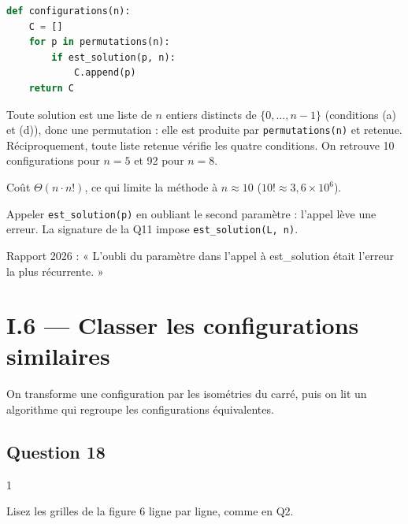 \documentclass[11pt,a4paper]{article}
\begin{document}
\begin{lstlisting}[language=Python]
def configurations(n):
    C = []
    for p in permutations(n):
        if est_solution(p, n):
            C.append(p)
    return C
\end{lstlisting}

Toute solution est une liste de \(n\) entiers distincts de \(\{0, \dots, n-1\}\) (conditions (a) et (d)), donc une permutation : elle est produite par \texttt{permutations(n)} et retenue. Réciproquement, toute liste retenue vérifie les quatre conditions. On retrouve 10 configurations pour \(n = 5\) et 92 pour \(n = 8\).

Coût \(\Theta(n \cdot n!)\), ce qui limite la méthode à \(n \approx 10\) (\(10! \approx 3{,}6 \times 10^6\)).

\begin{piege}

Appeler \texttt{est\_solution(p)} en oubliant le second paramètre : l'appel lève une erreur. La signature de la Q11 impose \texttt{est\_solution(\allowbreak{}L,\allowbreak{}\ n)\allowbreak{}}.

\end{piege}

\begin{jury}

Rapport 2026 : « L'oubli du paramètre dans l'appel à est\_solution était l'erreur la plus récurrente. »

\end{jury}

\hypertarget{i.6-classer-les-configurations-similaires}{%
\section{I.6 --- Classer les configurations similaires}\label{i.6-classer-les-configurations-similaires}}

On transforme une configuration par les isométries du carré, puis on lit un algorithme qui regroupe les configurations équivalentes.

\hypertarget{question-18}{%
\subsection{Question 18}\label{question-18}}

\begin{indication}{1}

Lisez les grilles de la figure 6 ligne par ligne, comme en Q2.

\end{indication}
\end{document}

